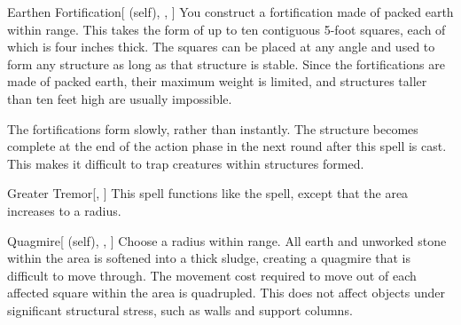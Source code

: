 \lowercase{\hypertarget{spell:Earthen Fortification}{}}\label{spell:Earthen Fortification}
\begin{attuneability}[\nth{3}]{\hypertarget{spell:Earthen Fortification}{Earthen Fortification}}[ (self), , ]
You construct a fortification made of packed earth within \rngmed range.
This takes the form of up to ten contiguous 5-foot squares, each of which is four inches thick.
The squares can be placed at any angle and used to form any structure as long as that structure is stable.
Since the fortifications are made of packed earth, their maximum weight is limited, and structures taller than ten feet high are usually impossible.

The fortifications form slowly, rather than instantly.
The structure becomes complete at the end of the action phase in the next round after this spell is cast.
This makes it difficult to trap creatures within structures formed.
\end{attuneability}
\vspace{0.25em}



\lowercase{\hypertarget{spell:Greater Tremor}{}}\label{spell:Greater Tremor}
\begin{freeability}[\nth{3}]{\hypertarget{spell:Greater Tremor}{Greater Tremor}}[, ]
This spell functions like the  spell, except that the area increases to a \areamed radius.
\end{freeability}
\vspace{0.25em}



\lowercase{\hypertarget{spell:Quagmire}{}}\label{spell:Quagmire}
\begin{attuneability}[\nth{3}]{\hypertarget{spell:Quagmire}{Quagmire}}[ (self), , ]
Choose a \areamed radius within \rngmed range.
All earth and unworked stone within the area is softened into a thick sludge, creating a quagmire that is difficult to move through.
The movement cost required to move out of each affected square within the area is quadrupled.
This does not affect objects under significant structural stress, such as walls and support columns.
\end{attuneability}
\vspace{0.25em}



